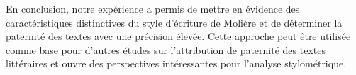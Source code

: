 \vspace{\baselineskip}

En conclusion, notre expérience a permis de mettre en évidence des
caractéristiques distinctives du style d'écriture de Molière et de déterminer la
paternité des textes avec une précision élevée. Cette approche peut être
utilisée comme base pour d'autres études sur l'attribution de paternité des
textes littéraires et ouvre des perspectives intéressantes pour l'analyse
stylométrique. 